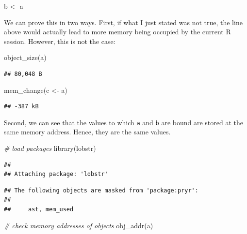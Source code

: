 \documentclass[
  12pt,
]{style/krantz}
\newenvironment{Shaded}{\begin{snugshade}}{\end{snugshade}}
\newcommand{\CommentTok}[1]{\textcolor[rgb]{0.56,0.35,0.01}{\textit{#1}}}
\newcommand{\FunctionTok}[1]{\textcolor[rgb]{0.00,0.00,0.00}{#1}}
\newcommand{\NormalTok}[1]{#1}
\newcommand{\OtherTok}[1]{\textcolor[rgb]{0.56,0.35,0.01}{#1}}
\begin{document}
\begin{Shaded}
\begin{Highlighting}[]
\NormalTok{b }\OtherTok{\textless{}{-}}\NormalTok{ a}
\end{Highlighting}
\end{Shaded}

We can prove this in two ways. First, if what I just stated was not true, the line above would actually lead to more memory being occupied by the current R session. However, this is not the case:

\begin{Shaded}
\begin{Highlighting}[]
\FunctionTok{object\_size}\NormalTok{(a)}
\end{Highlighting}
\end{Shaded}

\begin{verbatim}
## 80,048 B
\end{verbatim}

\begin{Shaded}
\begin{Highlighting}[]
\FunctionTok{mem\_change}\NormalTok{(c }\OtherTok{\textless{}{-}}\NormalTok{ a)}
\end{Highlighting}
\end{Shaded}

\begin{verbatim}
## -387 kB
\end{verbatim}

Second, we can see that the values to which \texttt{a} and \texttt{b} are bound are stored at the same memory address. Hence, they are the same values.

\begin{Shaded}
\begin{Highlighting}[]
\CommentTok{\# load packages}
\FunctionTok{library}\NormalTok{(lobstr)}
\end{Highlighting}
\end{Shaded}

\begin{verbatim}
## 
## Attaching package: 'lobstr'
\end{verbatim}

\begin{verbatim}
## The following objects are masked from 'package:pryr':
## 
##     ast, mem_used
\end{verbatim}

\begin{Shaded}
\begin{Highlighting}[]
\CommentTok{\# check memory addresses of objects}
\FunctionTok{obj\_addr}\NormalTok{(a)}
\end{Highlighting}
\end{Shaded}
\end{document}

